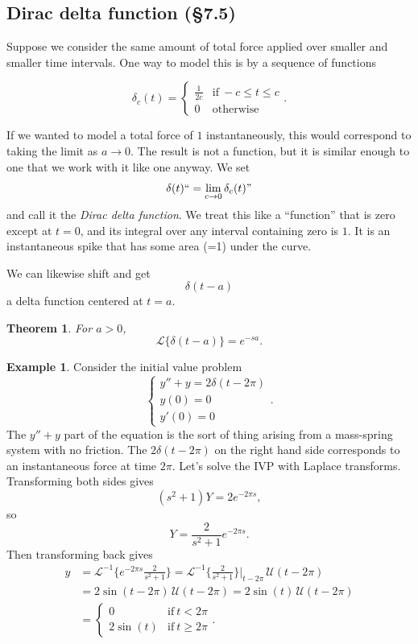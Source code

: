 \documentclass[12pt]{amsart}
\numberwithin{equation}{section}
\theoremstyle{plain} %
\newtheorem{thm}[equation]{Theorem}
\theoremstyle{definition}
\newtheorem{ex}[equation]{Example}
\theoremstyle{remark}
\newcommand{\LA}[1]{\mathcal{L}\{ #1 \}}
\newcommand{\LAi}[1]{\mathcal{L}^{-1}\{ #1 \}}
\newcommand{\U}{\mathcal{U}}
\begin{document}
\subsection*{Dirac delta function (\S7.5)}

Suppose we consider the same amount of total force applied over smaller and smaller time intervals. One way to model this is by a sequence of functions

\[ \delta_c(t) = \begin{cases} \frac{1}{2c} &\text{if} \ -c \leq t \leq c \\ 0 &\text{otherwise}\end{cases}.\]

If we wanted to model a total force of $1$ instantaneously, this would correspond to taking the limit as $a\to 0$. The result is not a function, but it is similar enough to one that we work with it like one anyway. We set
\[ \delta(t) ``= \lim_{c\to 0} \delta_c(t)"\]
and call it the \emph{Dirac delta function}. We treat this like a ``function'' that is zero except at $t=0$, and its integral over any interval containing zero is $1$. It is an instantaneous spike that has some area (=1) under the curve.

We can likewise shift and get
\[ \delta(t-a)\]
a delta function centered at $t=a$.

\begin{thm} 
For $a>0$,
\[ \LA{\delta(t-a)} = e^{-sa}.\]
\end{thm}

\begin{ex} Consider the initial value problem
\[ \begin{cases} y'' + y = 2\delta(t-2\pi)\\
y(0)=0\\
y'(0)=0\end{cases}.\]
The $y'' + y$ part of the equation is the sort of thing arising from a mass-spring system with no friction. The $2 \delta(t-2\pi)$ on the right hand side corresponds to an instantaneous force at time $2\pi$. Let's solve the IVP with Laplace transforms.
Transforming both sides gives
\[ (s^2+1) Y = 2 e^{-2\pi s},\]
so \[Y= \frac{2}{s^2+1}e^{-2\pi s}.\]
Then transforming back gives
\[\begin{aligned} y &= \LAi{e^{-2\pi s}\frac{2}{s^2+1}} = \LAi{\frac{2}{s^2+1}}|_{t-2\pi} \, \U(t-2 \pi) \\&= 2 \sin(t-2\pi)\,\U(t-2 \pi) = 2 \sin(t)\,\U(t-2 \pi)\\
&= \begin{cases} 0 &\text{if} \ t< 2\pi \\
2\sin(t) &\text{if} \ t\geq 2\pi\end{cases}.\end{aligned}\]
\end{ex}
\end{document}
